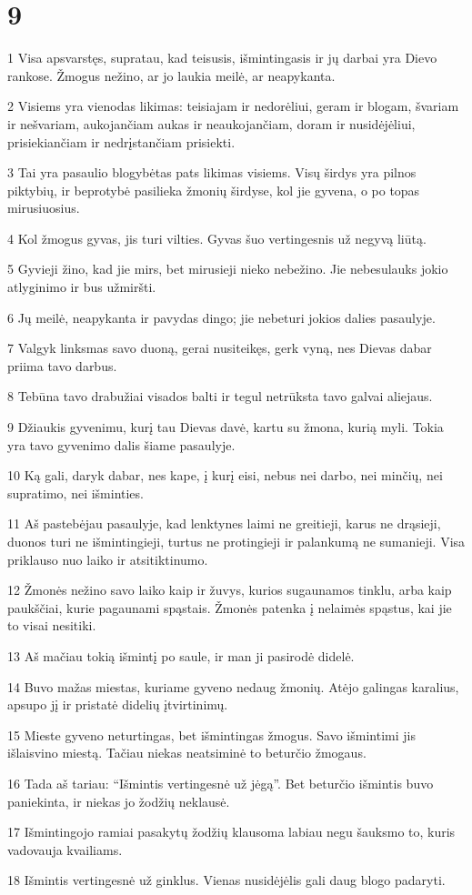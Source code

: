 \chapter{9}


\par 1 Visa apsvarstęs, supratau, kad teisusis, išmintingasis ir jų darbai yra Dievo rankose. Žmogus nežino, ar jo laukia meilė, ar neapykanta. 
\par 2 Visiems yra vienodas likimas: teisiajam ir nedorėliui, geram ir blogam, švariam ir nešvariam, aukojančiam aukas ir neaukojančiam, doram ir nusidėjėliui, prisiekiančiam ir nedrįstančiam prisiekti. 
\par 3 Tai yra pasaulio blogybė­tas pats likimas visiems. Visų širdys yra pilnos piktybių, ir beprotybė pasilieka žmonių širdyse, kol jie gyvena, o po to­pas mirusiuosius. 
\par 4 Kol žmogus gyvas, jis turi vilties. Gyvas šuo vertingesnis už negyvą liūtą. 
\par 5 Gyvieji žino, kad jie mirs, bet mirusieji nieko nebežino. Jie nebesulauks jokio atlyginimo ir bus užmiršti. 
\par 6 Jų meilė, neapykanta ir pavydas dingo; jie nebeturi jokios dalies pasaulyje. 
\par 7 Valgyk linksmas savo duoną, gerai nusiteikęs, gerk vyną, nes Dievas dabar priima tavo darbus. 
\par 8 Tebūna tavo drabužiai visados balti ir tegul netrūksta tavo galvai aliejaus. 
\par 9 Džiaukis gyvenimu, kurį tau Dievas davė, kartu su žmona, kurią myli. Tokia yra tavo gyvenimo dalis šiame pasaulyje. 
\par 10 Ką gali, daryk dabar, nes kape, į kurį eisi, nebus nei darbo, nei minčių, nei supratimo, nei išminties. 
\par 11 Aš pastebėjau pasaulyje, kad lenktynes laimi ne greitieji, karus ne drąsieji, duonos turi ne išmintingieji, turtus ne protingieji ir palankumą ne sumanieji. Visa priklauso nuo laiko ir atsitiktinumo. 
\par 12 Žmonės nežino savo laiko kaip ir žuvys, kurios sugaunamos tinklu, arba kaip paukščiai, kurie pagaunami spąstais. Žmonės patenka į nelaimės spąstus, kai jie to visai nesitiki. 
\par 13 Aš mačiau tokią išmintį po saule, ir man ji pasirodė didelė. 
\par 14 Buvo mažas miestas, kuriame gyveno nedaug žmonių. Atėjo galingas karalius, apsupo jį ir pristatė didelių įtvirtinimų. 
\par 15 Mieste gyveno neturtingas, bet išmintingas žmogus. Savo išmintimi jis išlaisvino miestą. Tačiau niekas neatsiminė to beturčio žmogaus. 
\par 16 Tada aš tariau: “Išmintis vertingesnė už jėgą”. Bet beturčio išmintis buvo paniekinta, ir niekas jo žodžių neklausė. 
\par 17 Išmintingojo ramiai pasakytų žodžių klausoma labiau negu šauksmo to, kuris vadovauja kvailiams. 
\par 18 Išmintis vertingesnė už ginklus. Vienas nusidėjėlis gali daug blogo padaryti.



